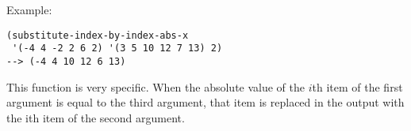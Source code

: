 \vspace{0.5cm}
\noindent Example:
\begin{verbatim}
(substitute-index-by-index-abs-x
 '(-4 4 -2 2 6 2) '(3 5 10 12 7 13) 2) 
--> (-4 4 10 12 6 13)
\end{verbatim}

\noindent This function is very specific. When the
absolute value of the $i$th item of the first argument
is equal to the third argument, that item is replaced
in the output with the ith item of the second
argument.













